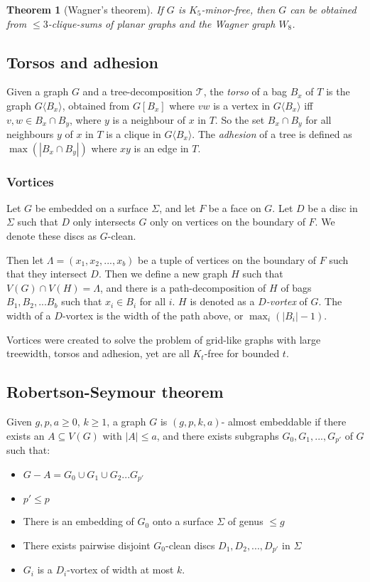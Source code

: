 \documentclass[]{article}
\newcommand{\tree}{\mathcal{T}}
\newtheorem{theorem}{Theorem}
\theoremstyle{definition}
\numberwithin{theorem}{section}
\numberwithin{equation}{section}
\begin{document}
\begin{theorem}[Wagner's theorem]
	If $G$ is $K_5$-minor-free, then $G$ can be obtained from $\leq 3$-clique-sums of planar graphs and the Wagner graph $W_8$.
\end{theorem}


\subsection{Torsos and adhesion}
Given a graph $G$ and a tree-decomposition $\tree$, the \textit{torso} of a bag $B_x$ of $T$ is the graph $G\langle B_x \rangle$, obtained from $G[B_x]$ where $vw$ is a vertex in $G\langle B_x \rangle$ iff $v,w \in B_x \cap B_y$, where $y$ is a neighbour of $x$ in $T$. So the set $B_x \cap B_y$ for all neighbours $y$ of $x$ in $T$ is a clique in $G\langle B_x \rangle$. 
The \textit{adhesion} of a tree is defined as $\max(|B_x \cap B_y|)$ where $xy$ is an edge in $T$.

\subsubsection{Vortices}
Let $G$ be embedded on a surface $\Sigma$, and let $F$ be a face on $G$. Let $D$ be a disc in $\Sigma$ such that $D$ only intersects $G$ only on vertices on the boundary of $F$. We denote these discs as $G$-clean. 

Then let $\Lambda = (x_1, x_2, ..., x_b)$ be a tuple of vertices on the boundary of $F$ such that they intersect $D$. Then we define a new graph $H$ such that $V(G) \cap V(H) = \Lambda$, and there is a path-decomposition of $H$ of bags $B_1, B_2, ... B_b$ such that $x_i \in B_i$ for all $i$. $H$ is denoted as a \textit{$D$-vortex} of $G$. The width of a $D$-vortex is the width of the path above, or $\max_i(|B_i| - 1)$. 

Vortices were created to solve the problem of grid-like graphs with large treewidth, torsos and adhesion, yet are all $K_t$-free for bounded $t$. 
\subsection{Robertson-Seymour theorem}
Given $g, p, a \geq 0$, $k \geq 1$, a graph $G$ is $(g, p, k, a)$- almost embeddable if there exists an $A \subseteq V(G)$ with $|A| \leq a$, and there exists subgraphs $G_0, G_1, ...,  G_{p'}$ of $G$ such that:
\begin{itemize}
	\item $G - A = G_0 \cup G_1 \cup G_2 ... G_{p'}$
	\item $p' \leq p$
	\item There is an embedding of $G_0$ onto a surface $\Sigma$ of genus $\leq g$
	\item There exists pairwise disjoint $G_0$-clean discs $D_1, D_2, ..., D_{p'}$ in $\Sigma$
	\item $G_i$ is a $D_i$-vortex of width at most $k$.
\end{itemize}
\end{document}
